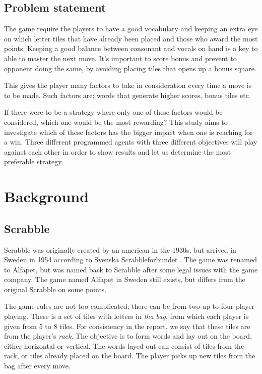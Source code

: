 \documentclass[a4paper, 12pt]{report}
\begin{document}
\section{Problem statement}
The game require the players to have a good vocabulary and keeping an extra eye on which letter tiles that have already been placed and those who award the most points. Keeping a good balance between consonant and vocals on hand is a key to able to master the next move. It’s important to score bonus and prevent to opponent doing the same, by avoiding placing tiles that opens up a bonus square.

This gives the player many factors to take in consideration every time a move is to be made. Such factors are; words that generate higher scores, bonus tiles etc.

If there were to be a strategy where only one of these factors would be considered, which one would be the most rewarding? This study aims to investigate which of these factors has the bigger impact when one is reaching for a win. Three different programmed agents with three different objectives will play against each other in order to show results and let us determine the most preferable strategy.


\chapter{Background}

\section{Scrabble}
Scrabble was originally created by an american in the 1930s, but arrived in Sweden in 1954 according to Svenska Scrabbleförbundet \cite{forbund}. The game was renamed to Alfapet, but was named back to Scrabble after some legal issues with the game company. The game named Alfapet in Sweden still exists, but differs from the original Scrabble on some points.

The game rules are not too complicated; there can be from two up to four player playing. There is a set of tiles with letters in \emph{tha bag}, from which each player is given from 5 to 8 tiles. For consistency in the report, we say that these tiles are from the player's \emph{rack}. The objective is to form words and lay out on the board, either horizontal or vertical. The words layed out can consist of tiles from the rack, or tiles already placed on the board. The player picks up new tiles from the bag after every move.
\end{document}
